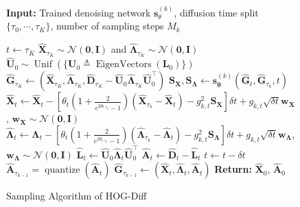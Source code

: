 \begin{figure}[t!]
\centering
\begin{minipage}{\linewidth}
\centering
\begin{algorithm}[H]
\small
\caption{ Sampling Algorithm of HOG-Diff }
    \textbf{Input:} Trained denoising network $\bm{s}_{\theta}^{(k)}$, 
    diffusion time split $\{\tau_0,\cdots,\tau_K\}$,
    number of sampling steps $M_k$
\begin{algorithmic}[1]
\STATE $t \leftarrow \tau_K$
\STATE $\widehat{\bm{X}}_{\tau_K}\sim \mathcal{N}(\bm{0}, \bm{I})$ and $\widehat{\bm{\Lambda}}_{\tau_K}\sim \mathcal{N}(\bm{0}, \bm{I})$
\STATE $\widehat{\bm{U}}_0 \sim \operatorname{Unif}\left(\{\bm{U}_0 \triangleq \operatorname{EigenVectors}(\bm{L}_0)\}\right)$
\STATE $\widehat{\bm{G}}_{\tau_K} \leftarrow (\widehat{\bm{X}}_{\tau_K},\widehat{\bm{\Lambda}}_{\tau_K},\widehat{\bm{D}}_{\tau_K}-\widehat{\bm{U}}_0 \widehat{\bm{\Lambda}}_{\tau_K} \widehat{\bm{U}}_0 ^\top)$
\STATE $\bm{S}_{\bm{X}}, \bm{S}_{\bm{\Lambda}} \leftarrow \bm{s}^{(k)}_{\bm{\theta}}(\widehat{\bm{G}}_t, \widehat{\bm{G}}_{\tau_k},t)$
\STATE $\widehat{\bm{X}}_t \leftarrow \widehat{\bm{X}}_t - \left[
\theta_t \left( 1 + \frac{2}{e^{2\bar{\theta}_{t:\tau_k}}-1}  \right)(\widehat{\bm{X}}_{\tau_k} - \widehat{\bm{X}}_t)
-g_{k,t}^2 \bm{S_X} \right]\delta t 
+g_{k,t} \sqrt{\delta t} \bm{w}_{\bm{X}}$, $\bm{w}_{\bm{X}} \sim \mathcal{N}(\bm{0}, \bm{I})$ 
\STATE $\widehat{\bm{\Lambda}}_t \leftarrow \widehat{\bm{\Lambda}}_t - \left[
\theta_t \left( 1 + \frac{2}{e^{2\bar{\theta}_{t:\tau_k}}-1}  \right)(\widehat{\bm{\Lambda}}_{\tau_k} - \widehat{\bm{\Lambda}}_t)
-g_{k,t}^2 \bm{S_\Lambda} \right] \delta t
+g_{k,t} \sqrt{\delta t}  \bm{w}_{\bm{\Lambda}}$, $\bm{w}_{\bm{\Lambda}} \sim \mathcal{N}(\bm{0}, \bm{I})$ 
\STATE $\widehat{\bm{L}}_t \leftarrow \widehat{\bm{U}}_0 \widehat{\bm{\Lambda}}_t \widehat{\bm{U}}_0^\top$
\STATE $\widehat{\bm{A}}_t \leftarrow \widehat{\bm{D}}_t - \widehat{\bm{L}}_t$
\STATE $t \leftarrow t - \delta t$
\ENDFOR
\STATE $\widehat{\bm{A}}_{\tau_{k-1}} = \operatorname{quantize}(\widehat{\bm{A}}_t)$
\STATE $\widehat{\bm{G}}_{\tau_{k-1}} \leftarrow (\widehat{\bm{X}}_t,\widehat{\bm{\Lambda}}_t,\widehat{\bm{A}}_t)$ 
\ENDFOR
\STATE \textbf{Return:} $\widehat{\bm{X}}_0$, $\widehat{\bm{A}}_0$ 
\end{algorithmic}
\label{alg:sample}
\end{algorithm}
\end{minipage}
\end{figure}